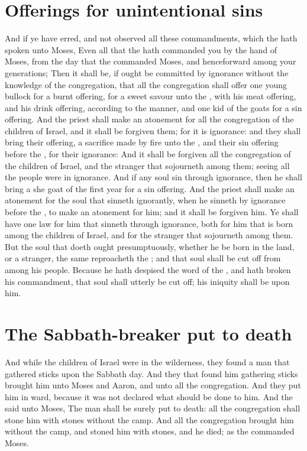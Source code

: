 \begin{biblechapter}
\section*{Offerings for unintentional sins}
\verse And if ye have erred, and not observed all these commandments, which the \LORD hath spoken unto Moses,
\verse Even all that the \LORD hath commanded you by the hand of Moses, from the day that the \LORD commanded Moses, and henceforward among your generations;
\verse Then it shall be, if ought be committed by ignorance without the knowledge of the congregation, that all the congregation shall offer one young bullock for a burnt offering, for a sweet savour unto the \LORD, with his meat offering, and his drink offering, according to the manner, and one kid of the goats for a sin offering.
\verse And the priest shall make an atonement for all the congregation of the children of Israel, and it shall be forgiven them; for it is ignorance: and they shall bring their offering, a sacrifice made by fire unto the \LORD, and their sin offering before the \LORD, for their ignorance:
\verse And it shall be forgiven all the congregation of the children of Israel, and the stranger that sojourneth among them; seeing all the people were in ignorance.
\verse And if any soul sin through ignorance, then he shall bring a she goat of the first year for a sin offering.
\verse And the priest shall make an atonement for the soul that sinneth ignorantly, when he sinneth by ignorance before the \LORD, to make an atonement for him; and it shall be forgiven him.
\verse Ye shall have one law for him that sinneth through ignorance, both for him that is born among the children of Israel, and for the stranger that sojourneth among them.
\verse But the soul that doeth ought presumptuously, whether he be born in the land, or a stranger, the same reproacheth the \LORD; and that soul shall be cut off from among his people.
\verse Because he hath despised the word of the \LORD, and hath broken his commandment, that soul shall utterly be cut off; his iniquity shall be upon him.
\section*{The Sabbath-breaker put to death}
\verse And while the children of Israel were in the wilderness, they found a man that gathered sticks upon the Sabbath day.
\verse And they that found him gathering sticks brought him unto Moses and Aaron, and unto all the congregation.
\verse And they put him in ward, because it was not declared what should be done to him.
\verse And the \LORD said unto Moses, The man shall be surely put to death: all the congregation shall stone him with stones without the camp.
\verse And all the congregation brought him without the camp, and stoned him with stones, and he died; as the \LORD commanded Moses.

\end{biblechapter}
